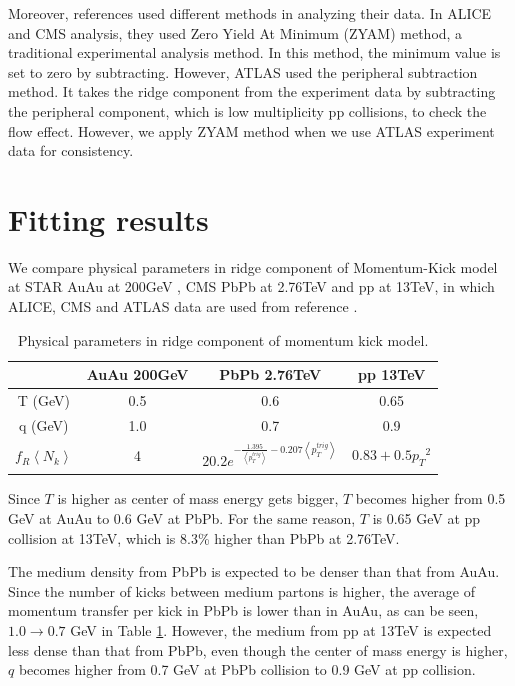 \documentclass[12pt]{article}
\begin{document}
Moreover, references \cite{alice, cms, atlas} used different methods in analyzing their data.
In ALICE and CMS analysis, they used Zero Yield At Minimum (ZYAM) method, a traditional experimental analysis method.
In this method, the minimum value is set to zero by subtracting.
However, ATLAS used the peripheral subtraction method.
It takes the ridge component from the experiment data by subtracting the peripheral component,
which is low multiplicity pp collisions, to check the flow effect.
However, we apply ZYAM method when we use ATLAS experiment data for consistency.


\section*{Fitting results}

We compare physical parameters in ridge component of Momentum-Kick model at STAR AuAu at 200GeV \cite{Wong_1}, CMS PbPb at 2.76TeV \cite{PbPb}
and pp at 13TeV, in which ALICE, CMS and ATLAS data are used from reference \cite{alice, cms, atlas}.

\begin{table}[h!]
  \centering
  \begin{tabular}{||c c c c||} 
   \hline
    & AuAu 200GeV & PbPb 2.76TeV & pp 13TeV \\ [0.5ex] 
   \hline\hline
   T (GeV) & 0.5 & 0.6 & 0.65 \\
   q (GeV) & 1.0 & 0.7 & 0.9 \\ 
  $f_R \left\langle N_k \right\rangle$ & 4 & $20.2e^{-\frac{1.395}{\left\langle p_{T}^{trig} \right\rangle}-0.207{\left\langle p_{T}^{trig} \right\rangle}}$ & $0.83+0.5{p_T}^2$ \\[1ex]
   \hline
 \end{tabular}
 \caption{Physical parameters in ridge component of momentum kick model.}
 \label{table:param}
\end{table}

Since $T$ is higher as center of mass energy gets bigger, $T$ becomes higher from 0.5 GeV at AuAu to 0.6 GeV at PbPb. 
For the same reason, $T$ is 0.65 GeV at pp collision at 13TeV, which is 8.3\% higher than PbPb at 2.76TeV.

The medium density from PbPb is expected to be denser than that from AuAu.
Since the number of kicks between medium partons is higher, the average of momentum transfer per kick in PbPb is lower than in AuAu,
as can be seen, $1.0 \rightarrow 0.7$ GeV in Table \ref{table:param}.
However, the medium from pp at 13TeV is expected less dense than that from PbPb, even though the center of mass energy is higher,
$q$ becomes higher from 0.7 GeV at PbPb collision to 0.9 GeV at pp collision. 
\end{document}
